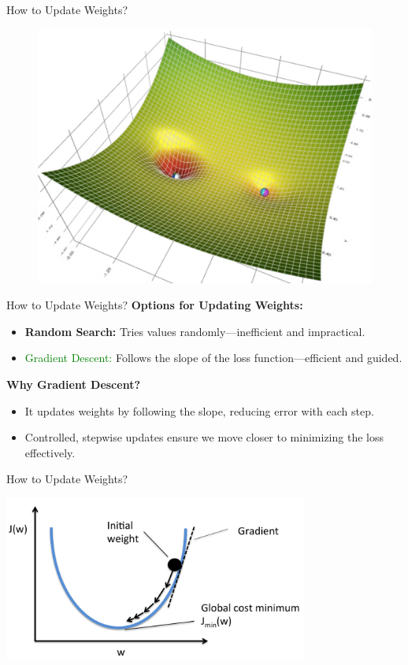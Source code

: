 \documentclass[serif, aspectratio=169]{beamer}
\begin{document}
\begin{frame}{How to Update Weights?}
\begin{figure}[!htb]
\begin{minipage}{0.3\textwidth}
  \end{minipage}\hfill
  \begin{minipage}{0.3\textwidth}
     \centering
     \includegraphics[width=.9\linewidth]{pic/gd3.png}
  \end{minipage}
\end{figure}
\end{frame}

\begin{frame}{How to Update Weights?}
 \textbf{Options for Updating Weights:}
    \begin{itemize}
        \item \textbf{Random Search:} Tries values randomly—inefficient and impractical.
        \item \textcolor{green}{Gradient Descent:} Follows the slope of the loss function—efficient and guided.
    \end{itemize}
    
    \textbf{Why Gradient Descent?}
    \begin{itemize}
        \item It updates weights by following the slope, reducing error with each step.
        \item Controlled, stepwise updates ensure we move closer to minimizing the loss effectively.
    \end{itemize}
\end{frame}

\begin{frame}{How to Update Weights?}

    \begin{center}
        \includegraphics[width=10cm]{pic/ball.png}  
    \end{center}
\end{frame}
\end{document}

